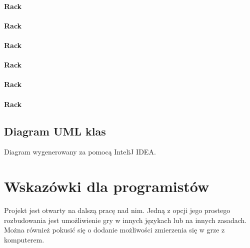 \documentclass[a4paper]{article}
\begin{document}
\paragraph{Rack}
\paragraph{Rack}
\paragraph{Rack}
\paragraph{Rack}
\paragraph{Rack}
\paragraph{Rack}
\subsection{Diagram UML klas}
Diagram wygenerowany za pomocą InteliJ IDEA.
\section{Wskazówki dla programistów}
Projekt jest otwarty na dalszą pracę nad nim. Jedną z opcji jego prostego rozbudowania jest umożliwienie gry w innych językach lub na innych zasadach. Można również pokusić się o dodanie możliwości zmierzenia się w grze z komputerem.
\end{document}
